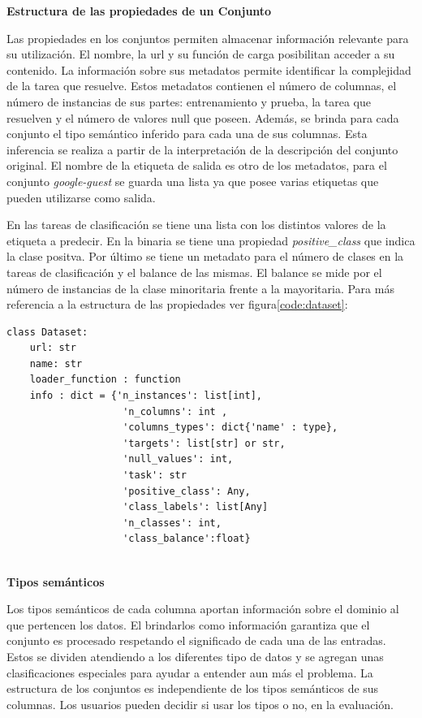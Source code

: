 \begin{flushleft} 
    { \textbf{Estructura de las propiedades de un Conjunto}}\label{class:dataset_pro}
\end{flushleft}
Las propiedades en los conjuntos permiten almacenar información relevante para su utilización. El nombre, la url y su función de carga posibilitan acceder a su contenido.
La información sobre sus metadatos permite identificar la complejidad de la tarea que resuelve.
Estos metadatos contienen el número de columnas, el número de instancias de sus partes: entrenamiento y prueba, la tarea que resuelven y el número de 
valores null que poseen. Además, se brinda para cada conjunto el tipo semántico inferido para cada una de sus columnas. Esta inferencia se realiza a partir de la 
interpretación de la descripción del conjunto original. El nombre de la etiqueta de salida es otro de los metadatos, para el conjunto \textit{google-guest} 
se guarda una lista ya que posee varias etiquetas que pueden utilizarse como salida. 

En las tareas de clasificación se tiene una lista con los distintos valores de la etiqueta a predecir. En la binaria se tiene una propiedad \textit{positive\_class} 
que indica la clase positva. Por último se tiene un metadato para el número de clases en la tareas de clasificación y el balance de las mismas. 
El balance se mide por el número de instancias de la clase minoritaria frente a la mayoritaria. 
Para más referencia a la estructura de las propiedades ver figura\ref{code:dataset}:      

\begin{lstlisting}[caption= Clase Dataset, label = code:dataset]
class Dataset:
    url: str
    name: str
    loader_function : function
    info : dict = {'n_instances': list[int],
                    'n_columns': int , 
                    'columns_types': dict{'name' : type},
                    'targets': list[str] or str,
                    'null_values': int,
                    'task': str 
                    'positive_class': Any,
                    'class_labels': list[Any] 
                    'n_classes': int, 
                    'class_balance':float}
  
\end{lstlisting}

\begin{flushleft} 
    { \textbf{Tipos semánticos}}\label{class:semantic_types}
\end{flushleft}
Los tipos semánticos de cada columna aportan información sobre el dominio al que pertencen los datos. El brindarlos como información garantiza que el conjunto 
es procesado respetando el significado de cada una de las entradas. Estos se dividen atendiendo a los diferentes tipo de datos y 
se agregan unas clasificaciones especiales para ayudar a entender aun más el problema.
La estructura de los conjuntos es independiente de los tipos semánticos de sus columnas. Los usuarios pueden decidir si usar los tipos o no, en la evaluación. 

